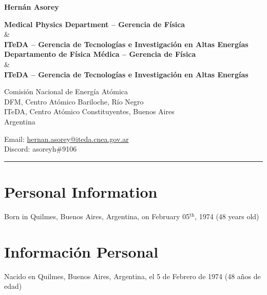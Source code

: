 \begin{center}{\huge \bf Hernán Asorey}\\[1cm]\end{center}

\begin{center}
\ifeng
	{\bf{Medical Physics Department -- Gerencia de Física}} \\
	\& \\
	{\bf{ITeDA -- Gerencia de Tecnologías e Investigación en Altas Energías}} \\
\else
	{\bf{Departamento de Física Médica -- Gerencia de Física}} \\
	\& \\
	{\bf{ITeDA -- Gerencia de Tecnologías e Investigación en Altas Energías}} \\
\fi
\end{center}
\begin{minipage}[t]{0.60\textwidth}
  Comisión Nacional de Energía Atómica\\
  DFM, Centro Atómico Bariloche, Río Negro\\
  ITeDA, Centro Atómico Constituyentes, Buenos Aires\\
  Argentina\\[.2cm]
\end{minipage}
\begin{minipage}[t]{0.465\textwidth}
  Email: \href{mailto:hernan.asorey@iteda.cnea.gov.ar}{hernan.asorey@iteda.cnea.gov.ar}\\
  Discord: asoreyh\#9106\\
\end{minipage}

\hrule

\ifeng

\ifres
\vspace{0.5cm}
\else
\section*{Personal Information}
Born in Quilmes, Buenos Aires, Argentina, on February 05$^\mathrm{th}$, 1974 (48 years old)\\
\fi

\else

\ifres
\vspace{0.5cm}
\else
\section*{Información Personal}
\fi
Nacido en Quilmes, Buenos Aires, Argentina, el 5 de Febrero de 1974 (48 años de edad)\\
\fi